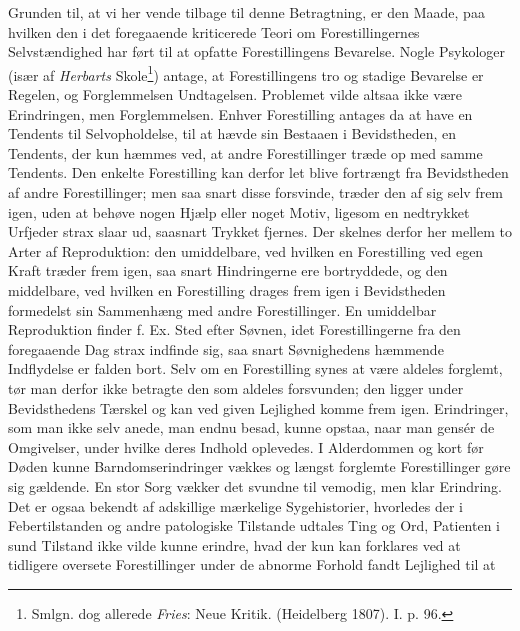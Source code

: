 \documentclass[12pt,a4paper,openany]{book}
\newcommand{\opage}[1]{\marginnote{\footnotesize\textit{[#1]}}}
\begin{document}
Grunden til, at vi her vende tilbage til denne Betragtning, er den
Maade, paa hvilken den i det foregaaende kriticerede Teori om
Forestillingernes Selvstændighed har ført til at opfatte Forestillingens
Bevarelse. Nogle Psykologer (især af \emph{Herbarts}
Skole\footnote[1]{Smlgn. dog allerede \emph{Fries}: Neue Kritik.
(Heidelberg 1807). I. p. 96.}) antage, at Forestillingens tro og stadige
Bevarelse er Regelen, og Forglemmelsen Undtagelsen. Problemet vilde
altsaa ikke være Erindringen, men Forglemmelsen. Enhver Forestilling
antages da at have en Tendents til Selvopholdelse, til at hævde sin
Bestaaen i Bevidstheden, en Tendents, der kun hæmmes ved, at andre
Forestillinger træde op med samme Tendents. Den enkelte Forestilling kan
derfor let blive fortrængt fra Bevidstheden af andre Forestillinger; men
saa snart disse forsvinde, træder den af sig selv frem igen, uden at
behøve nogen Hjælp eller noget Motiv, ligesom en nedtrykket Urfjeder
strax slaar ud, saasnart Trykket fjernes. Der skelnes derfor her mellem
to Arter af Reproduktion: den umiddelbare, ved hvilken en Forestilling
ved egen Kraft træder frem igen, saa snart Hindringerne ere bortryddede,
og den middelbare, ved hvilken en Forestilling drages frem igen i
Bevidstheden formedelst sin Sammenhæng med andre Forestillinger. En
umiddelbar Reproduktion finder f. Ex. Sted efter Søvnen, idet
Forestillingerne fra den foregaaende Dag strax indfinde sig, saa snart
Søvnighedens hæmmende Indflydelse er falden bort. Selv om en
Forestilling synes at være aldeles forglemt, tør man derfor ikke
betragte den som aldeles forsvunden; den ligger under Bevidsthedens
Tærskel og kan ved given Lejlighed komme frem igen. Erindringer, som man
ikke
\opage{174}selv anede, man endnu besad, kunne opstaa, naar man gensér de
Omgivelser, under hvilke deres Indhold oplevedes. I Alderdommen og kort
før Døden kunne Barndomserindringer vækkes og længst forglemte
Forestillinger gøre sig gældende. En stor Sorg vækker det svundne til
vemodig, men klar Erindring. Det er ogsaa bekendt af adskillige
mærkelige Sygehistorier, hvorledes der i Febertilstanden og andre
patologiske Tilstande udtales Ting og Ord, Patienten i sund Tilstand
ikke vilde kunne erindre, hvad der kun kan forklares ved at tidligere
oversete Forestillinger under de abnorme Forhold fandt Lejlighed til at
\end{document}
